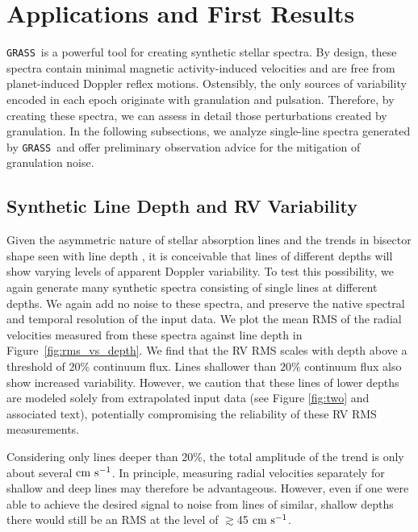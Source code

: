 \documentclass[twocolumn]{aastex63}
\newcommand{\cms}{\ {\rm cm\ s}^{-1}}
\newcommand{\grass}{\texttt{GRASS}}
\newcommand{\revise}[1]{#1}
\begin{document}
\section{Applications and First Results} \label{results}

\grass\ is a powerful tool for creating synthetic stellar spectra. By design, these spectra contain minimal magnetic activity-induced velocities and are free from planet-induced Doppler reflex motions. Ostensibly, the only sources of variability encoded in each epoch originate with granulation and pulsation. Therefore, by creating these spectra, we can assess in detail those perturbations created by granulation. In the following subsections, we analyze single-line spectra generated by \grass\ and offer preliminary observation advice for the mitigation of granulation noise. \par 

\subsection{Synthetic Line Depth and RV Variability} \label{sec:depth_var}

Given the asymmetric nature of stellar absorption lines \revise{and the trends in bisector shape seen with line depth \citep{Gray2008}}, it is conceivable that lines of different depths \revise{will} show varying levels of apparent Doppler variability. To test this possibility, we again generate many synthetic spectra consisting of single lines at different depths. We again add no noise to these spectra, and preserve the native spectral and temporal resolution of the input data. We plot the \revise{mean} RMS of the radial velocities measured from these spectra against line depth in Figure~\ref{fig:rms_vs_depth}. We find that the RV RMS scales with depth above a threshold of $20\%$ continuum flux. Lines shallower than $20\%$ continuum flux also show increased variability. However, we caution that these lines of lower depths are modeled solely from extrapolated input data \revise{(see Figure \ref{fig:two} and associated text)}, potentially compromising the reliability of these RV RMS measurements. \par 

\revise{Considering only lines deeper than 20\%, the total amplitude of the trend is only about several$\cms$. In principle, measuring radial velocities separately for shallow and deep lines may therefore be advantageous. However, even if one were able to achieve the desired signal to noise from lines of similar, shallow depths there would still be an RMS at the level of $\gtrsim$45$\cms$.} \par
\end{document}
